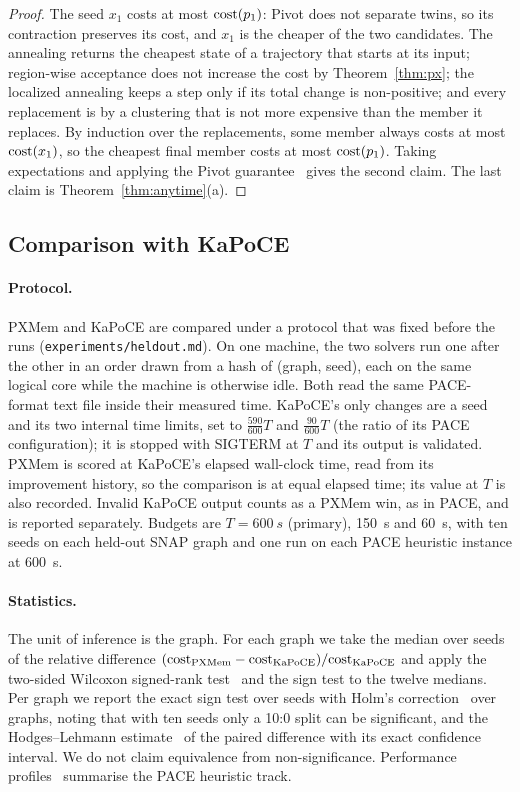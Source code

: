 \begin{proof}
The seed $x_1$ costs at most $\mathrm{cost}(p_1)$: Pivot does not separate twins, so its
contraction preserves its cost, and $x_1$ is the cheaper of the two
candidates.  The annealing returns the cheapest state of a trajectory that
starts at its input; region-wise acceptance does not increase the cost by
Theorem~\ref{thm:px}; the localized annealing keeps a step only if its total
change is non-positive; and every replacement is by a clustering that is not
more expensive than the member it replaces.  By induction over the
replacements, some member always costs at most $\mathrm{cost}(x_1)$, so the cheapest
final member costs at most $\mathrm{cost}(p_1)$.  Taking expectations and applying the
Pivot guarantee~\citep{AilonCN08} gives the second claim.  The last claim is
Theorem~\ref{thm:anytime}(a).
\end{proof}


\subsection{Comparison with KaPoCE}\label{sec:exp-h2h}

\paragraph{Protocol.}  PXMem and KaPoCE are compared under a
protocol that was fixed before the runs
(\texttt{experiments/heldout.md}).  On one machine, the two solvers run one
after the other in an order drawn from a hash of (graph, seed), each on the
same logical core while the machine is otherwise idle.  Both read the same
PACE-format text file inside their measured time.  KaPoCE's only changes are
a seed and its two internal time limits, set to $\tfrac{590}{600}T$ and
$\tfrac{90}{600}T$ (the ratio of its PACE configuration); it is stopped with
SIGTERM at $T$ and its output is validated.  PXMem is scored at KaPoCE's
elapsed wall-clock time, read from its improvement history, so the
comparison is at equal elapsed time; its value at $T$ is also recorded.
Invalid KaPoCE output counts as a PXMem win, as in PACE, and is reported
separately.  Budgets are $T=\SI{600}{s}$ (primary), \SI{150}{s} and
\SI{60}{s}, with ten seeds on each held-out SNAP graph and one run on each
PACE heuristic instance at \SI{600}{s}.

\paragraph{Statistics.}  The unit of inference is the graph.  For each graph
we take the median over seeds of the relative difference
$(\mathrm{cost}_{\mathrm{PXMem}}-\mathrm{cost}_{\mathrm{KaPoCE}})/\mathrm{cost}_{\mathrm{KaPoCE}}$ and
apply the two-sided Wilcoxon signed-rank test~\cite{Wilcoxon45} and the sign
test to the twelve medians.  Per graph we report the exact sign test over
seeds with Holm's correction~\cite{Holm79} over graphs, noting that with ten
seeds only a 10:0 split can be significant, and the Hodges--Lehmann
estimate~\cite{HodgesL63} of the paired difference with its exact confidence
interval.  We do not claim equivalence from non-significance.  Performance
profiles~\cite{DolanM02profiles} summarise the PACE heuristic track.


